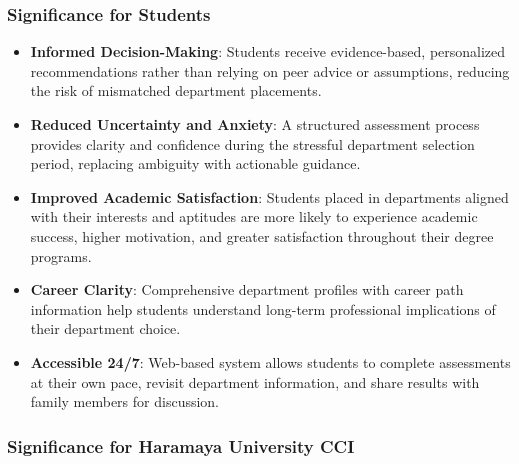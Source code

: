 \documentclass[12pt, a4paper]{article}
\begin{document}
\subsubsection*{Significance for Students}

\begin{itemize}[leftmargin=1.5em, itemsep=3pt]
    \item \textbf{Informed Decision-Making}: Students receive evidence-based, personalized recommendations rather than relying on peer advice or assumptions, reducing the risk of mismatched department placements.
    
    \item \textbf{Reduced Uncertainty and Anxiety}: A structured assessment process provides clarity and confidence during the stressful department selection period, replacing ambiguity with actionable guidance.
    
    \item \textbf{Improved Academic Satisfaction}: Students placed in departments aligned with their interests and aptitudes are more likely to experience academic success, higher motivation, and greater satisfaction throughout their degree programs.
    
    \item \textbf{Career Clarity}: Comprehensive department profiles with career path information help students understand long-term professional implications of their department choice.
    
    \item \textbf{Accessible 24/7}: Web-based system allows students to complete assessments at their own pace, revisit department information, and share results with family members for discussion.
\end{itemize}

\subsubsection*{Significance for Haramaya University CCI}
\end{document}

